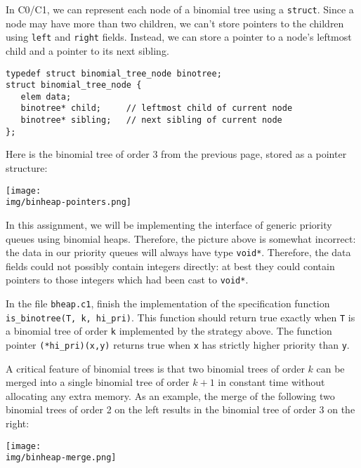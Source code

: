 \documentclass[12pt]{exam}
\begin{document}
In C0/C1, we can represent each node of a binomial tree using a
\lstinline'struct'. Since a node may have more than two children, we
can't store pointers to the children using \lstinline'left' and
\lstinline'right' fields. Instead, we can store a pointer to a node's
leftmost child and a pointer to its next sibling.

\begin{lstlisting}[numbers=none]
typedef struct binomial_tree_node binotree;
struct binomial_tree_node {
   elem data;
   binotree* child;     // leftmost child of current node
   binotree* sibling;   // next sibling of current node
};
\end{lstlisting}

\noindent
Here is the binomial tree of order 3 from the previous page, stored as
a pointer structure:
\begin{center}
\texttt{[image: \\img/binheap-pointers.png]}
\end{center}
In this assignment, we will be implementing the interface of generic
priority queues using binomial heaps. Therefore, the picture above is
somewhat incorrect: the data in our priority queues will always have
type \lstinline'void*'. Therefore, the data fields could not possibly
contain integers directly: at best they could contain pointers to
those integers which had been cast to \lstinline'void*'.

\begin{task}[3]
  In the file \lstinline'bheap.c1', finish the implementation of the
  specification function \lstinline'is_binotree(T, k, hi_pri)'. This
  function should return true exactly when \lstinline'T' is a binomial
  tree of order \lstinline'k' implemented by the strategy above. The
  function pointer \lstinline'(*hi_pri)(x,y)' returns true when
  \lstinline'x' has strictly higher priority than \lstinline'y'.
\end{task}

A critical feature of binomial trees is that two binomial trees of
order $k$ can be merged into a single binomial tree of order $k+1$ in
constant time without allocating any extra memory.
As an example, the merge of the following two binomial trees of order
2 on the left results in the binomial tree of order 3 on the right:
\begin{center}
\texttt{[image: \\img/binheap-merge.png]}
\end{center}
\end{document}
